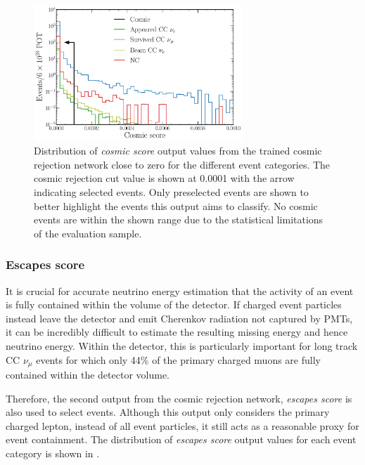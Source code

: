 \begin{figure} %
    \includegraphics[width=0.7\textwidth]{diagrams/7-results/final_cosmic_zoomed_outputs.pdf}
    \caption[Distribution of cosmic score output values close to zero]
    {Distribution of \emph{cosmic score} output values from the trained cosmic rejection network
        close to zero for the different event categories. The cosmic rejection cut value is shown
        at 0.0001 with the arrow indicating selected events. Only preselected events are shown to
        better highlight the events this output aims to classify. No cosmic events are within the
        shown range due to the statistical limitations of the evaluation sample.}
    \label{fig:cosmic_zoomed_outputs}
\end{figure}

\subsubsection*{Escapes score} %

It is crucial for accurate neutrino energy estimation that the activity of an event is fully
contained within the volume of the detector. If charged event particles instead leave the detector
and emit Cherenkov radiation not captured by PMTs, it can be incredibly difficult to estimate the
resulting missing energy and hence neutrino energy. Within the \chipsfive detector, this is
particularly important for long track CC $\nu_{\mu}$ events for which only 44\% of the primary
charged muons are fully contained within the detector volume.

Therefore, the second output from the cosmic rejection network, \emph{escapes score} is also used
to select events. Although this output only considers the primary charged lepton, instead of all
event particles, it still acts as a reasonable proxy for event containment. The distribution of
\emph{escapes score} output values for each event category is shown in
.

